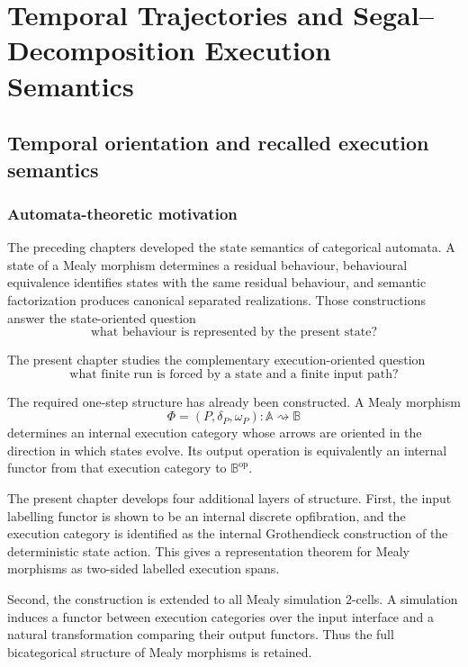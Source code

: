 \chapter{Temporal Trajectories and Segal--Decomposition Execution Semantics}
\label{ch:temporal-trajectories-segal-decomposition-execution}

\section{Temporal orientation and recalled execution semantics}
\label{sec:temporal-orientation-recalled-execution}

\subsection{Automata-theoretic motivation}
\label{subsec:temporal-motivation}

The preceding chapters developed the state semantics of categorical automata.
A state of a Mealy morphism determines a residual behaviour, behavioural
equivalence identifies states with the same residual behaviour, and semantic
factorization produces canonical separated realizations. Those constructions
answer the state-oriented question
\[
    \text{what behaviour is represented by the present state?}
\]

The present chapter studies the complementary execution-oriented question
\[
    \text{what finite run is forced by a state and a finite input path?}
\]

The required one-step structure has already been constructed. A Mealy
morphism
\[
    \Phi=(P,\delta_P,\omega_P):
    \mathbb A\rightsquigarrow\mathbb B
\]
determines an internal execution category whose arrows are oriented in the
direction in which states evolve. Its output operation is equivalently an
internal functor from that execution category to
\(\mathbb B^{\mathrm{op}}\).

The present chapter develops four additional layers of structure.
First, the input labelling functor is shown to be an internal discrete
opfibration, and the execution category is identified as the internal
Grothendieck construction of the deterministic state action. This gives a
representation theorem for Mealy morphisms as two-sided labelled execution
spans.

Second, the construction is extended to all Mealy simulation \(2\)-cells.
A simulation induces a functor between execution categories over the input
interface and a natural transformation comparing their output functors.
Thus the full bicategorical structure of Mealy morphisms is retained.


